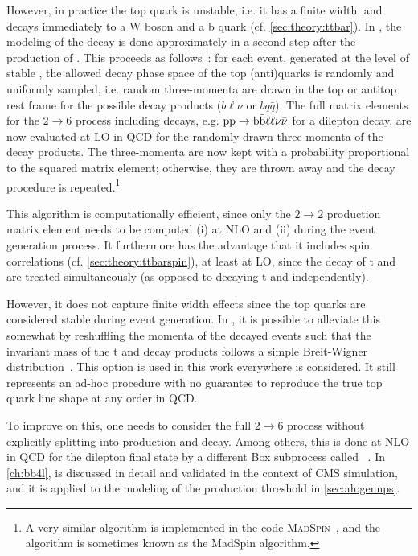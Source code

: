 However, in practice the top quark is unstable, i.e. it has a finite width, and decays immediately to a W boson and a b quark (cf. \cref{sec:theory:ttbar}). In \hvq, the modeling of the decay is done approximately in a second step after the production of \ttbar. This proceeds as follows~\cite{Frixione:2007zp,Artoisenet:2012st}: 
for each event, generated at the level of stable \ttbar, the allowed decay phase space of the top (anti)quarks is randomly and uniformly sampled, i.e. random three-momenta are drawn in the top or antitop rest frame for the possible decay products ($b \ell \nu$ or $b q \bar{q}$). The full matrix elements for the $2 \rightarrow 6$ process including decays, e.g. $\mathrm{pp} \rightarrow \mathrm{b \bar{b}} \ell \ell \nu \bar{\nu}$ for a dilepton decay, are now evaluated at LO in QCD for the randomly drawn three-momenta of the decay products. The three-momenta are now kept with a probability proportional to the squared matrix element; otherwise, they are thrown away and the decay procedure is repeated.\footnote{A very similar algorithm is implemented in the code \textsc{MadSpin}~\cite{Artoisenet:2012st}, and the algorithm is sometimes known as the MadSpin algorithm.}

This algorithm is computationally efficient, since only the $2 \rightarrow 2$ production matrix element needs to be computed (i) at NLO and (ii) during the event generation process. It furthermore has the advantage that it includes \ttbar spin correlations (cf. \cref{sec:theory:ttbarspin}), at least at LO, since the decay of t and \tbar are treated simultaneously (as opposed to decaying t and \tbar independently). 

However, it does not capture finite width effects since the top quarks are considered stable during event generation. In \hvq, it is possible to alleviate this somewhat by reshuffling the momenta of the decayed \ttbar events such that the invariant mass of the t and \tbar decay products follows a simple Breit-Wigner distribution~\cite{Artoisenet:2012st}. This option is used in this work everywhere \hvq is considered. It still represents an ad-hoc procedure with no guarantee to reproduce the true top quark line shape at any order in QCD. 

To improve on this, one needs to consider the full $2 \rightarrow 6$ process without explicitly splitting into production and decay. Among others, this is done at NLO in QCD for the dilepton final state by a different \powheg Box subprocess called \bbfourl ~\cite{Jezo:2016ujg}. In \cref{ch:bb4l}, \bbfourl is discussed in detail and validated in the context of CMS simulation, and it is applied to the modeling of the \ttbar production threshold in \cref{sec:ah:gennps}.

